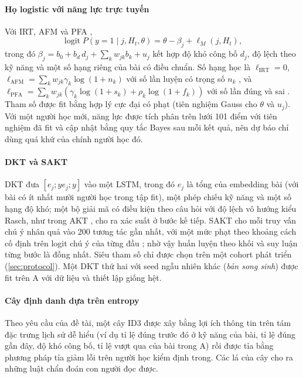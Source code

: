 \documentclass[a4paper,preprint,12pt,authoryear]{elsarticle}
\begin{document}
\paragraph{Họ logistic với năng lực trực tuyến} Với IRT, AFM và PFA \citep[xem tổng quan về họ mô hình này ở][]{pelanek2017learner},
\begin{equation}
\operatorname{logit} P(y=1\mid j,H_t,\theta) = \theta - \beta_j + \ell_M(j,H_t),
\label{eq:logistic}
\end{equation}
trong đó $\beta_j = b_0 + b_d\,d_j + \sum_k w_{jk} b_k + u_j$ kết hợp độ khó công bố $d_j$, độ lệch theo kỹ năng và một số hạng riêng của bài có điều chuẩn. Số hạng học là $\ell_{\mathrm{IRT}}=0$, $\ell_{\mathrm{AFM}}=\sum_k w_{jk}\gamma_k\log(1+n_k)$ với số lần luyện có trọng số $n_k$ \citep{cen2006lfa}, và $\ell_{\mathrm{PFA}}=\sum_k w_{jk}(\gamma_k\log(1+s_k)+\rho_k\log(1+f_k))$ với số lần đúng và sai \citep{pavlik2009pfa}. Tham số được fit bằng hợp lý cực đại có phạt (tiên nghiệm Gauss cho $\theta$ và $u_j$). Với một người học mới, năng lực được tích phân trên lưới 101 điểm với tiên nghiệm đã fit và cập nhật bằng quy tắc Bayes sau mỗi kết quả, nên dự báo chỉ dùng quá khứ của chính người học đó.

\paragraph{DKT và SAKT} DKT \citep{piech2015dkt} đưa $[e_j; y e_j; y]$ vào một LSTM, trong đó $e_j$ là tổng của embedding bài (với bài có ít nhất mười người học trong tập fit), một phép chiếu kỹ năng và một số hạng độ khó; một bộ giải mã có điều kiện theo câu hỏi với độ lệch vô hướng kiểu Rasch, như trong AKT \citep{ghosh2020akt}, cho ra xác suất ở bước kế tiếp. SAKT \citep{pandey2019sakt} cho mỗi truy vấn chú ý nhân quả vào 200 tương tác gần nhất, với một mức phạt theo khoảng cách cố định trên logit chú ý của từng đầu \citep{press2022alibi}; nhờ vậy huấn luyện theo khối và suy luận từng bước là đồng nhất. Siêu tham số chỉ được chọn trên một cohort phát triển (\cref{sec:protocol}). Một DKT thứ hai với seed ngẫu nhiên khác (\emph{bản song sinh}) được fit trên A với dữ liệu và thiết lập giống hệt.

\paragraph{Cây định danh dựa trên entropy} Theo yêu cầu của đề tài, một cây ID3 \citep{quinlan1986id3} được xây bằng lợi ích thông tin trên tám đặc trưng lịch sử dễ hiểu (ví dụ tỉ lệ đúng trước đó ở kỹ năng của bài, tỉ lệ đúng gần đây, độ khó công bố, tỉ lệ vượt qua của bài trong A) rồi được tỉa bằng phương pháp tỉa giảm lỗi trên người học kiểm định trong. Các lá của cây cho ra những luật chẩn đoán con người đọc được.
\end{document}
